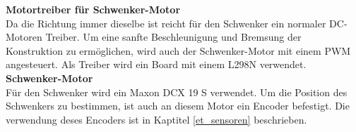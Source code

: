\documentclass[../../main.tex]{subfiles}
\begin{document}
    \textbf{Motortreiber für Schwenker-Motor}\\
    Da die Richtung immer dieselbe ist reicht für den Schwenker ein normaler DC-Motoren Treiber. Um eine sanfte Beschleunigung und Bremsung der Konstruktion zu ermöglichen, wird auch der Schwenker-Motor mit einem PWM angesteuert. Als Treiber wird ein Board mit einem L298N verwendet.\\

    \textbf{Schwenker-Motor}\\
    Für den Schwenker wird ein Maxon DCX 19 S verwendet. Um die Position des Schwenkers zu bestimmen, ist auch an diesem Motor ein Encoder befestigt. Die verwendung deses Encoders ist in Kaptitel \ref{et_sensoren} beschrieben. \cite{MaxonDCX19S}\\

    
\end{document}
